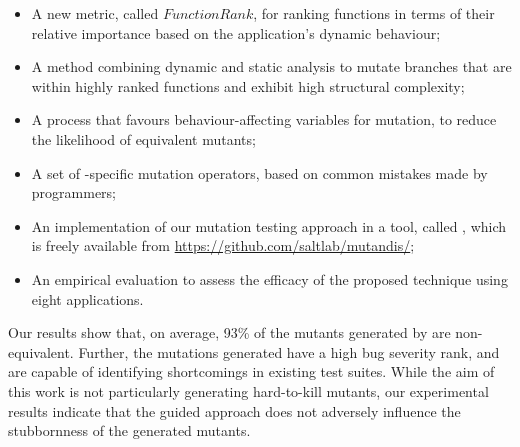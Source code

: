 \begin{itemize}
\item A new metric, called $FunctionRank$, for ranking functions in terms of their relative importance based on the application's dynamic  behaviour;

\item A method combining dynamic and static analysis to mutate branches that are within highly ranked functions and exhibit high structural complexity; 

\item A process that favours behaviour-affecting variables for mutation, to reduce the likelihood of equivalent mutants;
\item A set of \javascript-specific mutation operators, based on common mistakes made by programmers;
\item An implementation of our mutation testing approach in a tool, called \mutandis{},  
 which is freely available from \url{https://github.com/saltlab/mutandis/}; 
\item An empirical evaluation to assess the efficacy of the proposed technique using eight \javascript applications.
\end{itemize}

Our results show that, on average,  93\% of the mutants generated by \mutandis are non-equivalent.
Further, the mutations generated have a high bug severity rank, and are capable of
identifying shortcomings in existing \javascript test suites. 
While the aim of this work is not particularly generating hard-to-kill mutants, our experimental results indicate that the guided approach does not adversely influence the stubbornness of the generated mutants.





